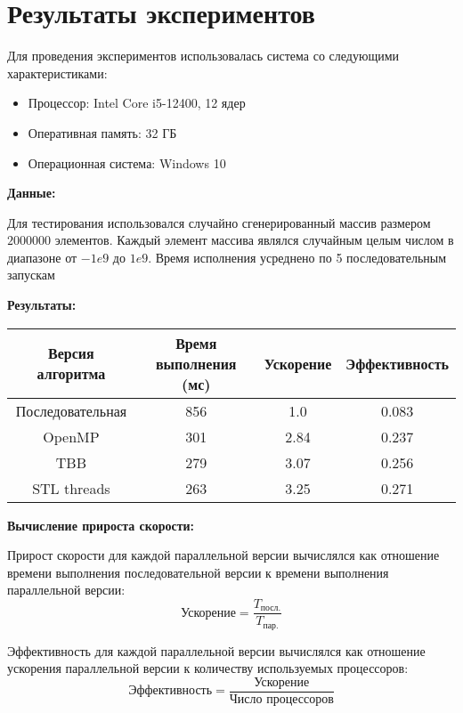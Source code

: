 \documentclass{report}
\begin{document}
\newpage

\section*{Результаты экспериментов}
\par Для проведения экспериментов использовалась система со следующими характеристиками:
\begin{itemize}
    \item Процессор: Intel Core i5-12400, 12 ядер
    \item Оперативная память: 32 ГБ
    \item Операционная система: Windows 10
\end{itemize}

\par \textbf{Данные:}
\par Для тестирования использовался случайно сгенерированный массив размером \(2000000\) элементов. Каждый элемент массива являлся случайным целым числом в диапазоне от \(-1e9\) до \(1e9\). Время исполнения усреднено по 5 последовательным запускам
\par 

\par \textbf{Результаты:}
\begin{center}
\begin{tabular}{ |c|c|c|c| }
    \hline
    Версия алгоритма & Время выполнения (мс) & Ускорение & Эффективность \\ 
    \hline
    Последовательная & 856 & 1.0 & 0.083 \\ 
    \hline
    OpenMP & 301 & 2.84 & 0.237 \\ 
    \hline
    TBB & 279 & 3.07 & 0.256 \\ 
    \hline
    STL threads & 263 & 3.25 & 0.271 \\ 
    \hline
\end{tabular}
\end{center}

\par \textbf{Вычисление прироста скорости:}
\par Прирост скорости для каждой параллельной версии вычислялся как отношение времени выполнения последовательной версии к времени выполнения параллельной версии:
\[ \text{Ускорение} = \frac{T_{\text{посл.}}}{T_{\text{пар.}}} \]
\par Эффективность для каждой параллельной версии вычислялся как отношение ускорения параллельной версии к количеству используемых процессоров:
\[ \text{Эффективность} = \frac{{\text{Ускорение}}}{{\text{Число процессоров}}} \]
\end{document}
